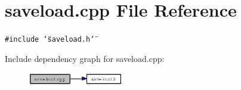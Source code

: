 \section{saveload.cpp File Reference}
\label{saveload_8cpp}
{\tt \#include \char`\"{}saveload.h\char`\"{}}\par


Include dependency graph for saveload.cpp:\begin{figure}[H]
\begin{center}
\leavevmode
\includegraphics[width=118pt]{saveload_8cpp__incl}
\end{center}
\end{figure}
